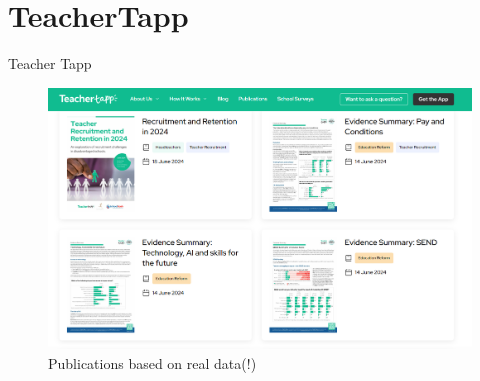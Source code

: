 \documentclass{beamer}					%
\begin{document}
\section{TeacherTapp}
\begin{frame}{Teacher Tapp}
    \begin{figure}
        \centering
        \includegraphics[width=1\linewidth]{figures/TeacherTapp.png}
        \caption{Publications based on real data(!)}
        \label{fig:enter-label}
    \end{figure}
\end{frame}
\end{document}
